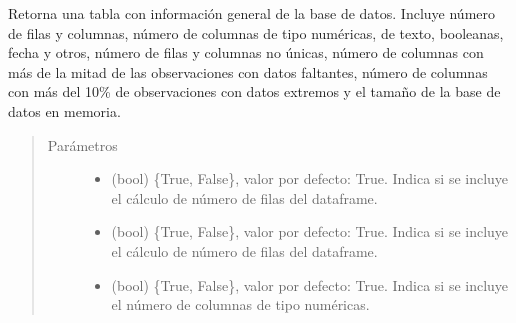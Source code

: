 \documentclass[letterpaper,10pt,openany,spanish]{sphinxmanual}
\begin{document}
\begin{fulllineitems}
\begin{fulllineitems}
\label{\detokenize{calidad_datos:calidad_datos.CalidadDatos.Resumen}}
Retorna una tabla con información general de la base de datos.        Incluye número de filas y columnas, número de columnas de tipo         numéricas, de texto, booleanas, fecha y otros, número de filas y         columnas no únicas, número de columnas con más de la mitad de las         observaciones con datos faltantes, número de columnas con más del         10\% de observaciones con datos extremos y el tamaño de la base de         datos en memoria.
\begin{quote}\begin{description}
\item[{Parámetros}] \leavevmode\begin{itemize}
\item {} 
 \textendash{} (bool) \{True, False\}, valor por defecto: True. Indica             si se incluye el cálculo de número de filas del dataframe.

\item {} 
 \textendash{} (bool) \{True, False\}, valor por defecto: True.             Indica si se incluye el cálculo de número de filas del dataframe.

\item {} 
 \textendash{} (bool) \{True, False\}, valor por defecto: True.             Indica si se incluye el número de columnas de tipo numéricas.


\end{itemize}
\end{description}
\end{quote}
\end{fulllineitems}
\end{fulllineitems}
\end{document}
